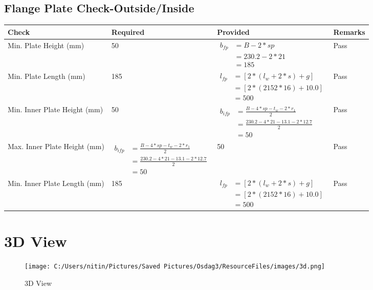 \documentclass{article}%
\begin{document}
%
\newpage%
\subsection{Flange Plate Check{-}Outside/Inside}%
\label{subsec:FlangePlateCheck{-}Outside/Inside}%
\renewcommand{\arraystretch}{1.2}%
\begin{longtable}{|p{4cm}|p{6cm}|p{5.5cm}|p{1.5cm}|}%
\hline%
\rowcolor{OsdagGreen}%
Check&Required&Provided&Remarks\\%
\hline%
\endhead%
\hline%
Min. Plate Height (mm)&50&$\begin{aligned} b_{fp} &= {B - 2*sp} \\ &= {230.2 - 2 * 21} \\ &=185\end{aligned}$&Pass\\%
\hline%
Min. Plate Length (mm)&185&$\begin{aligned} l_{fp} & = [2*(l_{w} + 2*s) + g]\\ &= [2*(2152*16) +10.0]\\ &=500\end{aligned}$&Pass\\%
\hline%
Min. Inner Plate Height (mm)&50&$\begin{aligned} b_{ifp} &= \frac{B - 4*sp - t_w - 2*r_1}{2} \\ &= \frac{230.2- 4*21-13.1- 2*12.7} {2} \\ &=50\end{aligned}$&Pass\\%
\hline%
Max. Inner Plate Height (mm)&$\begin{aligned} b_{ifp} &= \frac{B - 4*sp - t_w - 2*r_1}{2} \\ &= \frac{230.2- 4*21-13.1- 2*12.7} {2} \\ &=50\end{aligned}$&50&Pass\\%
\hline%
Min. Inner Plate Length (mm)&185&$\begin{aligned} l_{fp} & = [2*(l_{w} + 2*s) + g]\\ &= [2*(2152*16) +10.0]\\ &=500\end{aligned}$&Pass\\%
\hline%
\end{longtable}

%
%
\newpage%
\section{3D View}%
\label{sec:3DView}%


\begin{figure}[h!]%
\centering%
\texttt{[image: C:/Users/nitin/Pictures/Saved Pictures/Osdag3/ResourceFiles/images/3d.png]}%
\caption{3D View}%
\end{figure}

%
\end{document}

